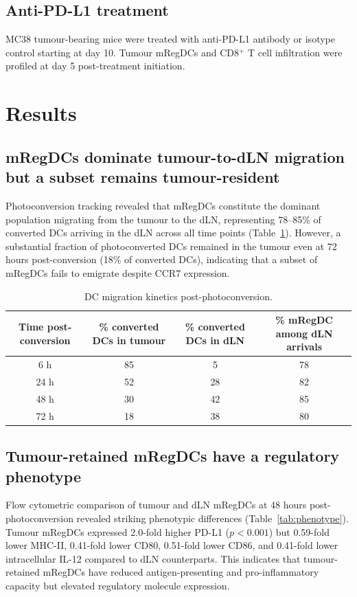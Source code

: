 \documentclass[11pt]{article}
\begin{document}
\subsection{Anti-PD-L1 treatment}
MC38 tumour-bearing mice were treated with anti-PD-L1 antibody or isotype control starting at day 10. Tumour mRegDCs and CD8$^+$ T cell infiltration were profiled at day 5 post-treatment initiation.

\section{Results}

\subsection{mRegDCs dominate tumour-to-dLN migration but a subset remains tumour-resident}
Photoconversion tracking revealed that mRegDCs constitute the dominant population migrating from the tumour to the dLN, representing 78--85\% of converted DCs arriving in the dLN across all time points (Table~\ref{tab:migration}). However, a substantial fraction of photoconverted DCs remained in the tumour even at 72 hours post-conversion (18\% of converted DCs), indicating that a subset of mRegDCs fails to emigrate despite CCR7 expression.

\begin{table}[h]
\centering
\caption{DC migration kinetics post-photoconversion.}
\label{tab:migration}
\begin{tabular}{cccc}
\toprule
Time post-conversion & \% converted DCs in tumour & \% converted DCs in dLN & \% mRegDC among dLN arrivals \\
\midrule
6 h & 85 & 5 & 78 \\
24 h & 52 & 28 & 82 \\
48 h & 30 & 42 & 85 \\
72 h & 18 & 38 & 80 \\
\bottomrule
\end{tabular}
\end{table}

\subsection{Tumour-retained mRegDCs have a regulatory phenotype}
Flow cytometric comparison of tumour and dLN mRegDCs at 48 hours post-photoconversion revealed striking phenotypic differences (Table~\ref{tab:phenotype}). Tumour mRegDCs expressed 2.0-fold higher PD-L1 ($p < 0.001$) but 0.59-fold lower MHC-II, 0.41-fold lower CD80, 0.51-fold lower CD86, and 0.41-fold lower intracellular IL-12 compared to dLN counterparts. This indicates that tumour-retained mRegDCs have reduced antigen-presenting and pro-inflammatory capacity but elevated regulatory molecule expression.
\end{document}
